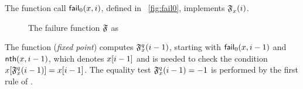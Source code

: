 
The function call
\(\textsf{fail}_0(x,i)\), defined in
\fig~\vref{fig:fail0}, implements \(\mathfrak{F}_{x}^{}(i)\).
\begin{figure}[t]
\abovedisplayskip=0pt
\belowdisplayskip=0pt
\caption{The failure function \(\mathfrak{F}\) as }
\label{fig:fail0}
\end{figure}
The function  (\emph{fixed point})
computes \(\mathfrak{F}_{x}^{q}(i-1)\), starting with
\(\textsf{fail}_0(x,i-1)\) and
\(\textsf{nth}(x,i-1)\), which denotes
\({x}[{i-1}]\) and is needed to check the condition
\(\smash{{x}[{\mathfrak{F}_{x}^{q}(i-1)}]} = {x}[{i-1}]\). The
equality test \(\mathfrak{F}_{x}^{q}(i-1) = -1\) is performed by the first
rule of .

